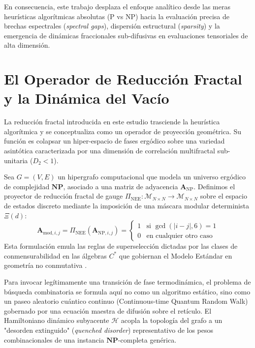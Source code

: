 \documentclass[sn-mathphys]{sn-jnl}
\begin{document}
En consecuencia, este trabajo desplaza el enfoque analítico desde las meras heurísticas algorítmicas absolutas (P vs NP) hacia la evaluación precisa de brechas espectrales (\textit{spectral gaps}), dispersión estructural (\textit{sparsity}) y la emergencia de dinámicas fraccionales sub-difusivas en evaluaciones tensoriales de alta dimensión.

\section{El Operador de Reducción Fractal y la Dinámica del Vacío}

La reducción fractal introducida en este estudio trasciende la heurística algorítmica y se conceptualiza como un operador de proyección geométrica. Su función es colapsar un hiper-espacio de fases ergódico sobre una variedad asintótica caracterizada por una dimensión de correlación multifractal sub-unitaria ($D_2 < 1$). 

\begin{definition}
Sea $G = (V, E)$ un hipergrafo computacional que modela un universo ergódico de complejidad $\mathbf{NP}$, asociado a una matriz de adyacencia $\mathbf{A}_{\text{NP}}$. Definimos el proyector de reducción fractal de gauge $\Pi_{\text{NEE}}: \mathcal{M}_{N \times N} \to \mathcal{M}_{N \times N}$ sobre el espacio de estados discreto mediante la imposición de una máscara modular determinista $\Xi(d)$:
\begin{equation}
\mathbf{A}_{\text{mod}, i,j} = \Pi_{\text{NEE}} (\mathbf{A}_{\text{NP}, i,j}) = 
\begin{cases} 
1 & \text{si } \gcd(|i - j|, 6) = 1 \\
0 & \text{en cualquier otro caso}
\end{cases}
\end{equation}
Esta formulación emula las reglas de superselección dictadas por las clases de conmensurabilidad en las álgebras $C^*$ que gobiernan el Modelo Estándar en geometría no conmutativa \cite{Connes2008}.
\end{definition}

Para invocar legítimamente una transición de fase termodinámica, el problema de búsqueda combinatoria se formula aquí no como un algoritmo estático, sino como un paseo aleatorio cuántico continuo (Continuous-time Quantum Random Walk) gobernado por una ecuación maestra de difusión sobre el retículo. El Hamiltoniano dinámico subyacente $\mathcal{H}$ acopla la topología del grafo a un "desorden extinguido" (\textit{quenched disorder}) representativo de los pesos combinacionales de una instancia $\mathbf{NP}$-completa genérica.
\end{document}
